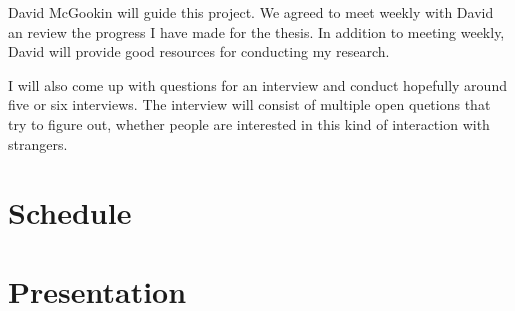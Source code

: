 \documentclass[12pt,a4paper,finnish,oneside]{article}
\begin{document}
David McGookin will guide this project. We agreed to meet weekly
with David an review the progress I have made for the thesis.
In addition to meeting weekly, David will provide good resources
for conducting my research.

I will also come up with questions for an interview and conduct
hopefully around five or six interviews. The interview will consist
of multiple open quetions that try to figure out, whether people
are interested in this kind of interaction with strangers.

\section{Schedule}



\section{Presentation}



%


% 

\renewcommand{\refname}{References}  %



\end{document}
